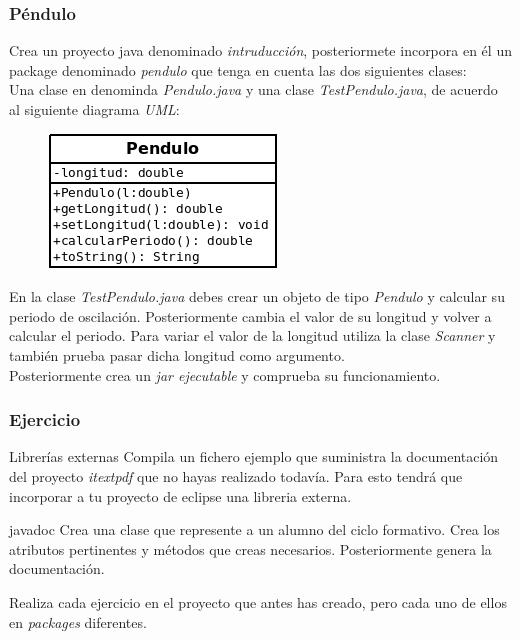 \documentclass{beamer}
\begin{document}
\begin{frame}
\frametitle{Péndulo}
Crea un proyecto java denominado \emph{intruducción}, posteriormete incorpora en él un package denominado \emph{pendulo} que tenga en cuenta las dos siguientes clases:\\
Una clase en denominda \emph{Pendulo.java} y una clase \emph{TestPendulo.java}, de acuerdo al siguiente diagrama \emph{UML}:
\begin{figure}
\includegraphics[scale=0.5]{imagenes/Pendulo.png}
\end{figure}
En la clase \emph{TestPendulo.java} debes crear un objeto de tipo \emph{Pendulo} y calcular su periodo de oscilación. Posteriormente cambia el valor de su longitud y volver a calcular el periodo. Para variar el valor de la longitud utiliza la clase \emph{Scanner} y también prueba pasar dicha longitud como argumento. \\ 
Posteriormente crea un \emph{jar ejecutable} y comprueba su funcionamiento.
\end{frame}

\begin{frame}
\frametitle{Ejercicio}
\begin{block}{Librerías externas}
Compila un fichero ejemplo que suministra la documentación del proyecto \emph{itextpdf} que no hayas realizado todavía. Para esto tendrá que incorporar a tu proyecto de eclipse una libreria externa.
\end{block}
\pause
\begin{block}{javadoc}
Crea una clase que represente a un alumno del ciclo formativo. Crea los atributos pertinentes y métodos que creas necesarios. Posteriormente genera la documentación.
\end{block}
\pause
Realiza cada ejercicio en el proyecto que antes has creado, pero cada uno de ellos en \emph{packages} diferentes.
\end{frame}
\end{document}
